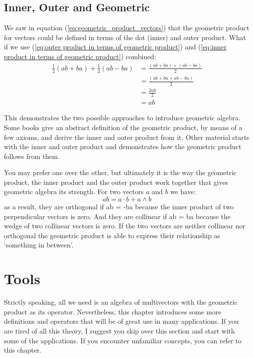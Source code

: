 \documentclass[10pt]{report}
\begin{document}
\section{Inner, Outer and Geometric}

We saw in equation (\ref{eq:geometric_product_vectors}) that the
geometric product for vectors could be defined in terms of the dot
(inner) and outer product. What if we use (\ref{eq:outer product
in terms of geometric product}) and (\ref{eq:inner product in
terms of geometric product}) combined:
\begin{align*}
    \frac{1}{2}(ab + ba) + \frac{1}{2}(ab - ba) &= \frac{(ab + ba) + (ab - ba)}{2} \nonumber\\
    &= \frac{(ab + ba + ab - ba)}{2} \nonumber\\
    &= \frac{2ab}{2} \nonumber\\
    &= ab\nonumber
\end{align*}

This demonstrates the two possible approaches to introduce
geometric algebra. Some books \cite{bib:hestenes clifford algebra}
give an abstract definition of the geometric product, by means of
a few axioms, and derive the inner and outer product from it.
Other material \cite{bib:hestenes new foundations} starts with the
inner and outer product and demonstrates how the geometric product
follows from them.

You may prefer one over the other, but ultimately it is the way
the geometric product, the inner product and the outer product
work together that gives geometric algebra its strength. For two
vectors $a$ and $b$ we have:
\begin{displaymath}
    ab = a\cdot b + a\wedge b
\end{displaymath}
as a result, they are orthogonal if ab = -ba because the inner
product of two perpendicular vectors is zero. And they are
collinear if ab = ba because the wedge of two collinear vectors is
zero. If the two vectors are neither collinear nor orthogonal the
geometric product is able to express their relationship as
`something in between'.

\chapter{Tools}

Strictly speaking, all we need is an algebra of multivectors with
the geometric product as its operator. Nevertheless, this chapter
introduces some more definitions and operators that will be of
great use in many applications. If you are tired of all this
theory, I suggest you skip over this section and start with some
of the applications. If you encounter unfamiliar concepts, you can
refer to this chapter.
\end{document}
